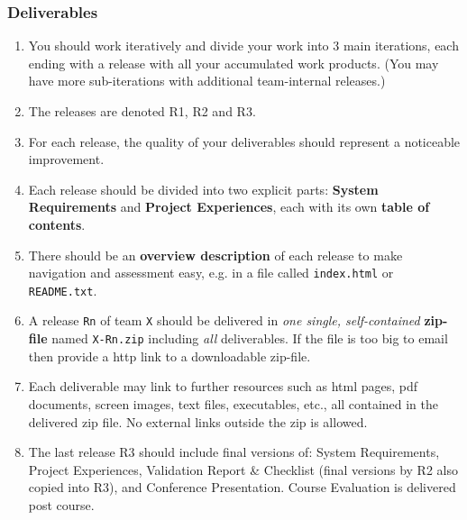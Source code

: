 \documentclass[10pt,a4paper]{article}
\begin{document}
\subsubsection{Deliverables}
 \begin{enumerate}[nolistsep]
\item You should work iteratively and divide your work into 3 main iterations, each ending with a release with all your accumulated work products. (You  may have more sub-iterations with additional team-internal releases.)
\item The releases are denoted R1, R2 and R3.
\item For each release, the quality of your deliverables should represent a noticeable improvement.
\item Each release should be divided into two explicit parts: {\bf System Requirements} and {\bf Project Experiences}, each with its own {\bf table of contents}.
\item There should be an {\bf overview description} of each release to make navigation and assessment  easy, e.g. in a file called \verb+index.html+ or \verb+README.txt+.
\item A release \verb+Rn+ of team \verb+X+ should be delivered in {\it one single, self-contained} {\bf zip-file} named \verb+X-Rn.zip+ including {\it all} deliverables. If the file is too big to email then provide a http link to a downloadable zip-file.

\item Each deliverable may link to further resources such as html pages, pdf documents, screen images, text files, executables, etc., all contained in the delivered zip file. No external links outside the zip is allowed.

\item The last release R3 should include final versions of: System Requirements, Project Experiences, Validation Report \& Checklist (final versions by R2 also copied into R3), and Conference Presentation. Course Evaluation is delivered post course.


\end{enumerate}
\end{document}
